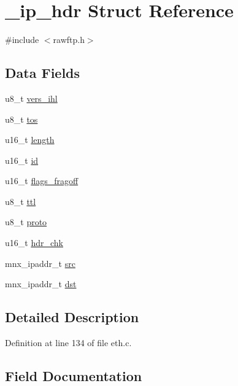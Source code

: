 \hypertarget{struct__ip__hdr}{}\section{\+\_\+ip\+\_\+hdr Struct Reference}
\label{struct__ip__hdr}


{\ttfamily \#include $<$rawftp.\+h$>$}

\subsection*{Data Fields}
\begin{DoxyCompactItemize}
\item 
u8\+\_\+t \hyperlink{struct__ip__hdr_a1307abcf8fe0d3514707b3b342a156a2}{vers\+\_\+ihl}
\item 
u8\+\_\+t \hyperlink{struct__ip__hdr_aac7f784f9b144bfe1c2fe17898c3f839}{tos}
\item 
u16\+\_\+t \hyperlink{struct__ip__hdr_a09060d112d8a50530a426bc2d8b4294c}{length}
\item 
u16\+\_\+t \hyperlink{struct__ip__hdr_a68261cb70868a456b2a795021dbd2ec1}{id}
\item 
u16\+\_\+t \hyperlink{struct__ip__hdr_a007d64973133a4a49edc1f3d10c574cf}{flags\+\_\+fragoff}
\item 
u8\+\_\+t \hyperlink{struct__ip__hdr_ac6f8d868fe85ab4e02b70759728ee1f9}{ttl}
\item 
u8\+\_\+t \hyperlink{struct__ip__hdr_ade0fbcd035f91fd726e43fdb77bb7f5a}{proto}
\item 
u16\+\_\+t \hyperlink{struct__ip__hdr_a3f27cc1bc3a730b9d6a9cdbf0ed1083f}{hdr\+\_\+chk}
\item 
mnx\+\_\+ipaddr\+\_\+t \hyperlink{struct__ip__hdr_a3c3920bc68ee63c63922a7bf2d5cc642}{src}
\item 
mnx\+\_\+ipaddr\+\_\+t \hyperlink{struct__ip__hdr_a4dc5bc8d3dd750e4ff204661044153aa}{dst}
\end{DoxyCompactItemize}


\subsection{Detailed Description}


Definition at line 134 of file eth.\+c.



\subsection{Field Documentation}
\hypertarget{struct__ip__hdr_a4dc5bc8d3dd750e4ff204661044153aa}{}\label{struct__ip__hdr_a4dc5bc8d3dd750e4ff204661044153aa} 
